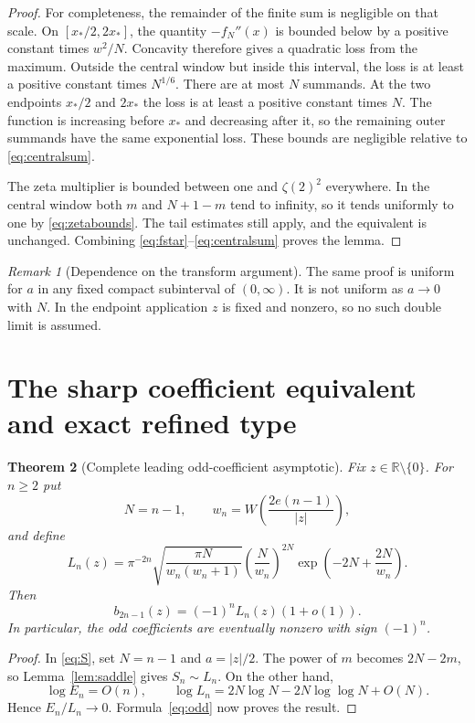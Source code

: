 \documentclass[11pt,a4paper]{article}
\numberwithin{equation}{section}
\newtheorem{theorem}{Theorem}[section]
\theoremstyle{definition}
\theoremstyle{remark}
\newtheorem{remark}[theorem]{Remark}
\newcommand{\R}{\mathbb R}
\begin{document}
\begin{proof}
For completeness, the remainder of the finite sum is negligible on that scale. On $[x_*/2,2x_*]$, the quantity $-f_N''(x)$ is bounded below by a positive constant times $w^2/N$. Concavity therefore gives a quadratic loss from the maximum. Outside the central window but inside this interval, the loss is at least a positive constant times $N^{1/6}$. There are at most $N$ summands. At the two endpoints $x_*/2$ and $2x_*$ the loss is at least a positive constant times $N$. The function is increasing before $x_*$ and decreasing after it, so the remaining outer summands have the same exponential loss. These bounds are negligible relative to \eqref{eq:centralsum}.

The zeta multiplier is bounded between one and $\zeta(2)^2$ everywhere. In the central window both $m$ and $N+1-m$ tend to infinity, so it tends uniformly to one by \eqref{eq:zetabounds}. The tail estimates still apply, and the equivalent is unchanged. Combining \eqref{eq:fstar}--\eqref{eq:centralsum} proves the lemma.
\end{proof}

\begin{remark}[Dependence on the transform argument]
The same proof is uniform for $a$ in any fixed compact subinterval of $(0,\infty)$. It is not uniform as $a\to0$ with $N$. In the endpoint application $z$ is fixed and nonzero, so no such double limit is assumed.
\end{remark}

\section{The sharp coefficient equivalent and exact refined type}
\label{sec:sharp}

\begin{theorem}[Complete leading odd-coefficient asymptotic]
\label{thm:coeffasym}
Fix $z\in\R\setminus\{0\}$. For $n\ge2$ put
\begin{equation}
 N=n-1,\qquad w_n=W\!\left(\frac{2e(n-1)}{|z|}\right),
 \label{eq:wn}
\end{equation}
and define
\begin{equation}
 L_n(z)=\pi^{-2n}\sqrt{\frac{\pi N}{w_n(w_n+1)}}
 \left(\frac{N}{w_n}\right)^{2N}
 \exp\!\left(-2N+\frac{2N}{w_n}\right).
 \label{eq:Ln}
\end{equation}
Then
\begin{equation}
 b_{2n-1}(z)=(-1)^nL_n(z)(1+o(1)).
 \label{eq:oddasym}
\end{equation}
In particular, the odd coefficients are eventually nonzero with sign $(-1)^n$.
\end{theorem}
\begin{proof}
In \eqref{eq:S}, set $N=n-1$ and $a=|z|/2$. The power of $m$ becomes $2N-2m$, so Lemma~\ref{lem:saddle} gives $S_n\sim L_n$. On the other hand,
\[
 \log E_n=O(n),\qquad
 \log L_n=2N\log N-2N\log\log N+O(N).
\]
Hence $E_n/L_n\to0$. Formula~\eqref{eq:odd} now proves the result.
\end{proof}
\end{document}
